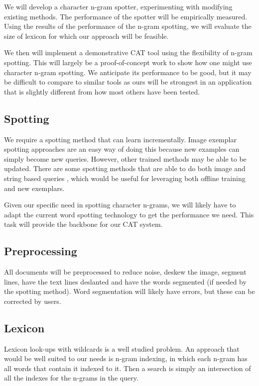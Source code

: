 \documentclass[ms]{byuprop}
\begin{document}
We will develop a character n-gram spotter, experimenting with modifying existing methods.
The performance of the spotter will be empirically measured. Using the results of the performance of the n-gram spotting, we will evaluate the size of lexicon for which our approach will be feasible.

We then will implement a demonstrative CAT tool using the flexibility of n-gram spotting. This will largely be a proof-of-concept work to show how one might use character n-gram spotting. We anticipate its performance to be good, but it may be difficult to compare to similar tools as ours will be strongest in an application that is slightly different from how most others have been tested.


\subsection{Spotting}
We require a spotting method that can learn incrementally. Image exemplar spotting approaches are an easy way of doing this because new examples can simply become new queries. However, other trained methods may be able to be updated. There are some spotting methods that are able to do both image and string based queries \cite{Almazan2014}, which would be useful for leveraging both offline training and new exemplars.

Given our specific need in spotting character n-grams, we will likely have to adapt the current word spotting technology to get the performance we need. This task will provide the backbone for our CAT system.

\subsection{Preprocessing}
All documents will be preprocessed to reduce noise, deskew the image, segment lines, have the text lines deslanted and have the words segmented (if needed by the spotting method). Word segmentation will likely have errors, but these can be corrected by users.

\subsection{Lexicon}
Lexicon look-ups with wildcards is a well studied problem. An approach that would be well suited to our needs is n-gram indexing, in which each n-gram has all words that contain it indexed to it. Then a search is simply an intersection of all the indexes for the n-grams in the query.
\end{document}
